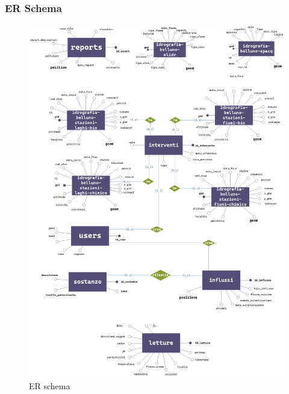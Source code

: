 \subsubsection{ER Schema}
\begin{figure}[H] \centering \includegraphics[width=39em]{img/ERSchema.png}  \caption{ER schema} \label{er} \end{figure}


